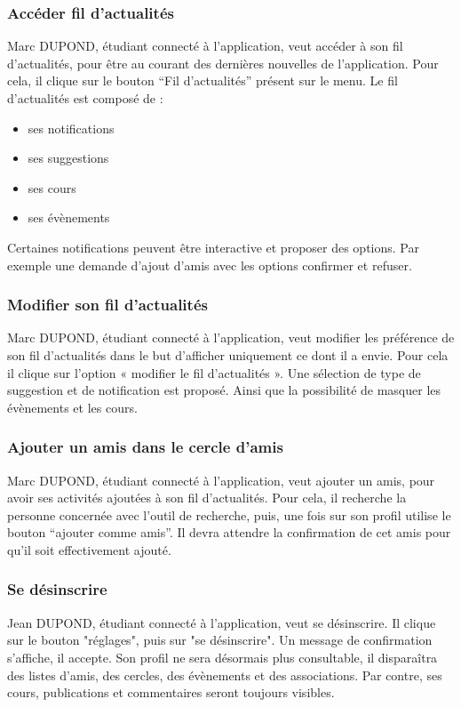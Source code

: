 \subsubsection*{Accéder fil d’actualités}
Marc DUPOND, étudiant connecté à l'application, veut accéder à son fil d’actualités, pour être au courant des dernières nouvelles de l'application. Pour cela, il clique sur le bouton “Fil d’actualités” présent sur le menu. Le fil d’actualités est composé de :
\begin{itemize}
\item ses notifications
\item ses suggestions
\item ses cours
\item ses évènements
\end{itemize}
Certaines notifications peuvent être interactive et proposer des options. Par exemple une demande d’ajout d’amis avec les options confirmer et refuser.
\subsubsection*{Modifier son fil d’actualités}
Marc DUPOND, étudiant connecté à l'application, veut modifier les préférence de son fil d’actualités dans le but d’afficher uniquement ce dont il a envie. Pour cela il clique sur l’option « modifier le fil d’actualités ». Une sélection de type de suggestion et de notification est proposé. Ainsi que la possibilité de masquer les évènements et les cours.
\subsubsection*{Ajouter un amis dans le cercle d’amis}
Marc DUPOND, étudiant connecté à l'application, veut ajouter un amis, pour avoir ses activités ajoutées à son fil d’actualités. Pour cela, il recherche la personne concernée avec l’outil de recherche, puis, une fois sur son profil utilise le bouton “ajouter comme amis”. Il devra attendre la confirmation de cet amis pour qu’il soit effectivement ajouté.
\subsubsection*{Se désinscrire}
Jean DUPOND, étudiant connecté à l'application, veut se désinscrire. Il clique sur le bouton "réglages", puis sur "se désinscrire". Un message de confirmation s'affiche, il accepte. Son profil ne sera désormais plus consultable, il disparaîtra des listes d'amis, des cercles, des évènements et des associations. Par contre, ses cours, publications et commentaires seront toujours visibles.
